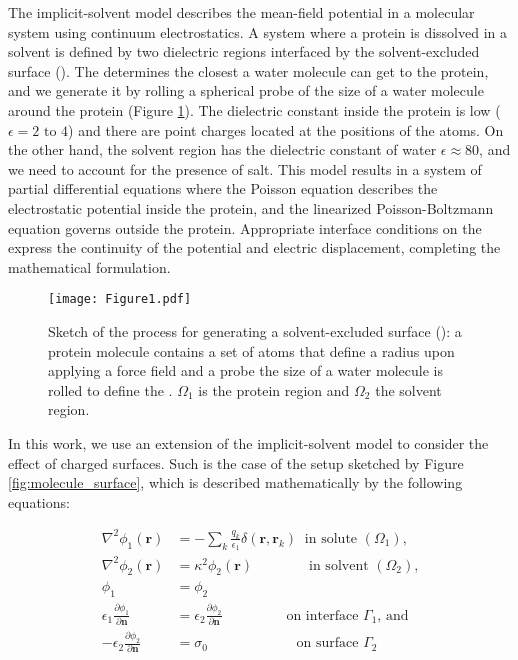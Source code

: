 
The implicit-solvent model describes the mean-field potential in a molecular system using continuum electrostatics. A system where a protein is dissolved in a solvent is defined by two dielectric regions interfaced by the solvent-excluded surface (\ses). The \ses determines the closest a water molecule can get to the protein, and we generate it by rolling a spherical probe of the size of a water molecule around the protein (Figure \ref{fig:forcefield-ses}). The dielectric constant inside the protein is low ($\epsilon= 2\text{ to }4$) and there are point charges located at the positions of the atoms. On the other hand, the solvent region has the dielectric constant of water $\epsilon \approx 80$, and we need to account for the presence of salt. This model results in a system of partial differential equations where the Poisson equation describes the electrostatic potential inside the protein, and the linearized Poisson-Boltzmann equation governs outside the protein. Appropriate interface conditions on the \ses express the continuity of the potential and electric displacement, completing the mathematical formulation.

\begin{figure}%
   \texttt{[image: Figure1.pdf]} 
   \caption{Sketch of the process for generating a solvent-excluded surface (\ses): a protein molecule contains a set of atoms that define a radius upon applying a force field and a probe the size of a water molecule is rolled to define the  \ses. $\Omega_1$ is the protein region and $\Omega_2$ the solvent region.}
   \label{fig:forcefield-ses}
\end{figure}

In this work, we use an extension of the implicit-solvent model to consider the effect of charged surfaces. Such is the case of the setup sketched by Figure \ref{fig:molecule_surface}, which is described mathematically by the following equations:


\begin{align} \label{eq:pde}
\nabla^2 \phi_1(\mathbf{r}) &= - \sum_k \frac{q_k}{\epsilon_1} \delta(\mathbf{r},\mathbf{r}_k) \ \text{ in solute $(\Omega_1)$,}  \nonumber \\ 
\nabla^2\phi_2 (\mathbf{r}) &= \kappa^2 \phi_2(\mathbf{r}) \quad \qquad \ \ \ \text{ in solvent $(\Omega_2)$,}  \nonumber \\ 
\phi_1 &=\phi_2 \nonumber \\ 
\epsilon_1 \frac{\partial \phi_1}{\partial \mathbf{n}} &= \epsilon_2 \frac{\partial \phi_2}{\partial \mathbf{n}}  \ \qquad \qquad \text{ on interface $\Gamma_1$, and} \nonumber \\
-\epsilon_2 \frac{\partial \phi_2}{\partial \mathbf{n}} &= \sigma_0 \qquad \qquad \qquad \text{ on surface $\Gamma_2$} 
\end{align}

